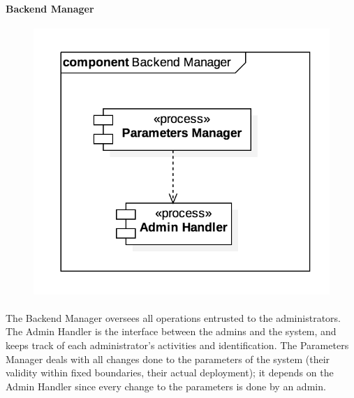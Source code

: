 		
		
		
		\paragraph{Backend Manager}
			\begin{figure}[h]
				\includegraphics[scale=0.4, center]{img/component_diagrams/11_backend_manager.png}
			\end{figure}
			
		\paragraph{} The Backend Manager oversees all operations entrusted to the administrators. The Admin Handler is the interface between the admins and the system, and keeps track of each administrator's activities and identification. The Parameters Manager deals with all changes done to the parameters of the system (their validity within fixed boundaries, their actual deployment); it depends on the Admin Handler since every change to the parameters is done by an admin. %
		
		
		
		

